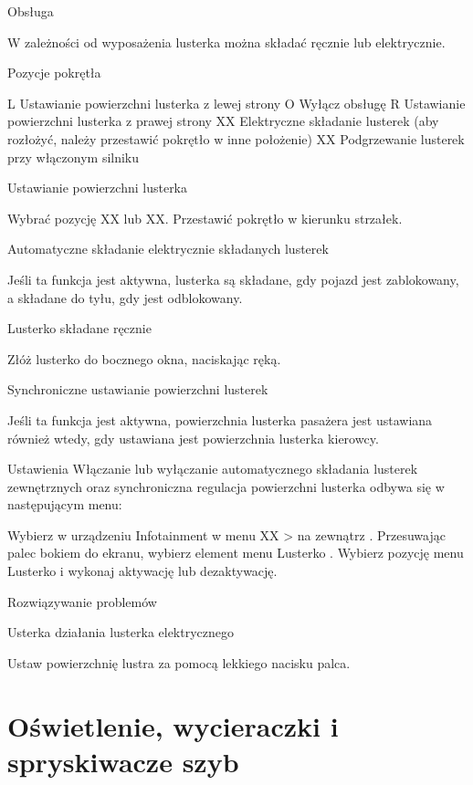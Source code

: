 Obsługa

W zależności od wyposażenia lusterka można składać ręcznie lub elektrycznie.

Pozycje pokrętła

L Ustawianie powierzchni lusterka z lewej strony
O Wyłącz obsługę
R Ustawianie powierzchni lusterka z prawej strony
XX Elektryczne składanie lusterek (aby rozłożyć, należy przestawić pokrętło w inne położenie)
XX Podgrzewanie lusterek przy włączonym silniku

Ustawianie powierzchni lusterka
\begin{itemizeArrow}
	\itemArrow Wybrać pozycję XX lub XX.
	\itemArrow Przestawić pokrętło w kierunku strzałek.
\end{itemizeArrow}
Automatyczne składanie elektrycznie składanych lusterek

Jeśli ta funkcja jest aktywna, lusterka są składane, gdy pojazd jest zablokowany, a składane do tyłu, gdy jest odblokowany.

Lusterko składane ręcznie
\begin{itemizeArrow}
	\itemArrow Złóż lusterko do bocznego okna, naciskając ręką.
\end{itemizeArrow}

Synchroniczne ustawianie powierzchni lusterek

Jeśli ta funkcja jest aktywna, powierzchnia lusterka pasażera jest ustawiana również wtedy, gdy ustawiana jest powierzchnia lusterka kierowcy.

Ustawienia
Włączanie lub wyłączanie automatycznego składania lusterek zewnętrznych oraz synchroniczna regulacja powierzchni lusterka odbywa się w następującym menu:
\begin{itemizeArrow}
	\itemArrow Wybierz w urządzeniu Infotainment w menu XX > na zewnątrz .
	\itemArrow Przesuwając palec bokiem do ekranu, wybierz element menu Lusterko .
	\itemArrow Wybierz pozycję menu Lusterko i wykonaj aktywację lub dezaktywację.
\end{itemizeArrow}

Rozwiązywanie problemów

Usterka działania lusterka elektrycznego

\begin{itemizeArrow}
	\itemArrow Ustaw powierzchnię lustra za pomocą lekkiego nacisku palca.
\end{itemizeArrow}

\section{Oświetlenie, wycieraczki i spryskiwacze szyb}

